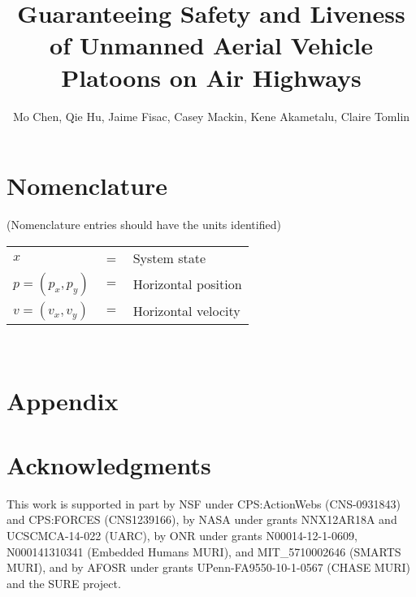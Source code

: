 \documentclass[journal]{aiaa-pretty}
\author{Mo Chen, Qie Hu, Jaime Fisac, Casey Mackin, Kene Akametalu, Claire Tomlin}
\title{Guaranteeing Safety and Liveness of Unmanned Aerial Vehicle Platoons on Air Highways}
\newcommand{\pos}{p} %
\newcommand{\vel}{v} %
\begin{document}
\maketitle

\section*{Nomenclature}
(Nomenclature entries should have the units identified)\\
\noindent\begin{tabular}{@{}lcl@{}}
$x$ &=& System state \\
$\pos=(\pos_x, \pos_y)$ &$=$& Horizontal position \\
$\vel=(\vel_x, \vel_y)$ &$=$& Horizontal velocity
\end{tabular} \\















\section*{Appendix}

\section*{Acknowledgments}
This work is supported in part by NSF under CPS:ActionWebs (CNS-0931843) and CPS:FORCES (CNS1239166), by NASA under grants NNX12AR18A and UCSCMCA-14-022 (UARC), by ONR under grants N00014-12-1-0609, N000141310341 (Embedded Humans MURI), and MIT\_5710002646 (SMARTS MURI), and by AFOSR under grants UPenn-FA9550-10-1-0567 (CHASE MURI) and the SURE project.



\end{document}
